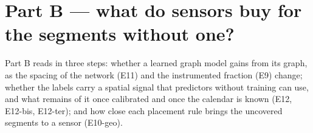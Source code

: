 \section{Part B — what do sensors buy for the segments without one?}
Part B reads in three steps: whether a learned graph model gains from its graph, as the spacing of the network (E11) and the instrumented fraction (E9) change; whether the labels carry a spatial signal that predictors without training can use, and what remains of it once calibrated and once the calendar is known (E12, E12-bis, E12-ter); and how close each placement rule brings the uncovered segments to a sensor (E10-geo).

